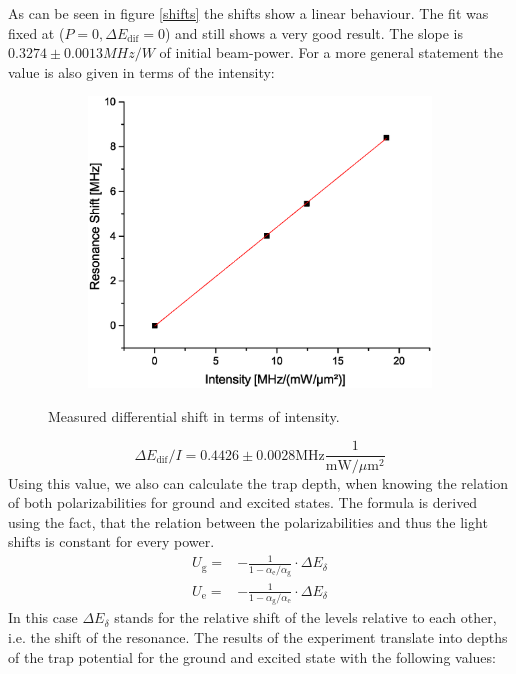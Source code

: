 As can be seen in figure \ref{shifts} the shifts show a linear behaviour. The fit was fixed at ($P=0, \Delta E_\mathrm{dif}=0$) and still shows a very good result. The slope is $0.3274\pm 0.0013\unit{MHz/W}$ of initial beam-power. For a more general statement the value is also given in terms of the intensity:
\begin{figure}[h]
\centering
\begin{subfigure}[b]{0.8\textwidth}
                \includegraphics[width=\textwidth]{shiftintens}
\end{subfigure}
\caption{Measured differential shift in terms of intensity.}
\label{shiftintens}
\end{figure}
\begin{equation}
\Delta E_\mathrm{dif}/I=0.4426\pm 0.0028\mathrm{MHz}\frac{1}{\mathrm{mW}/\mu \mathrm{m}^2}
\end{equation}
Using this value, we also can calculate the trap depth, when knowing the relation of both polarizabilities for ground and excited states. The formula is derived using the fact, that the relation between the polarizabilities and thus the light shifts is constant for every power.
\begin{align}
U_{\mathrm{g}}=&-\frac{1}{1-\alpha_{\mathrm{e}}/\alpha_{\mathrm{g}}}\cdot \Delta E_\delta\\
U_{\mathrm{e}}=&-\frac{1}{1-\alpha_{\mathrm{g}}/\alpha_{\mathrm{e}}}\cdot \Delta E_\delta
\end{align}
In this case $\Delta E_\delta$ stands for the relative shift of the levels relative to each other, i.e. the shift of the resonance. The results of the experiment translate into depths of the trap potential for the ground and excited state with the following values:
